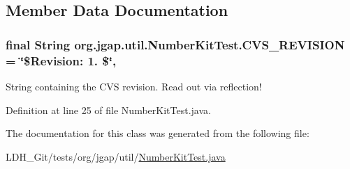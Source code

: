 \subsection{Member Data Documentation}
\hypertarget{classorg_1_1jgap_1_1util_1_1_number_kit_test_aaed0b4818558079bf6844cbe32ecd9b3}{
\subsubsection[{C\-V\-S\-\_\-\-R\-E\-V\-I\-S\-I\-O\-N}]{\setlength{\rightskip}{0pt plus 5cm}final String org.\-jgap.\-util.\-Number\-Kit\-Test.\-C\-V\-S\-\_\-\-R\-E\-V\-I\-S\-I\-O\-N = \char`\"{}\$Revision\-: 1. \$\char`\"{}\hspace{0.3cm}{\ttfamily [static]}, {\ttfamily [private]}}}\label{classorg_1_1jgap_1_1util_1_1_number_kit_test_aaed0b4818558079bf6844cbe32ecd9b3}
String containing the C\-V\-S revision. Read out via reflection! 

Definition at line 25 of file Number\-Kit\-Test.\-java.



The documentation for this class was generated from the following file\-:\begin{DoxyCompactItemize}
\item 
L\-D\-H\-\_\-\-Git/tests/org/jgap/util/\hyperlink{_number_kit_test_8java}{Number\-Kit\-Test.\-java}\end{DoxyCompactItemize}
